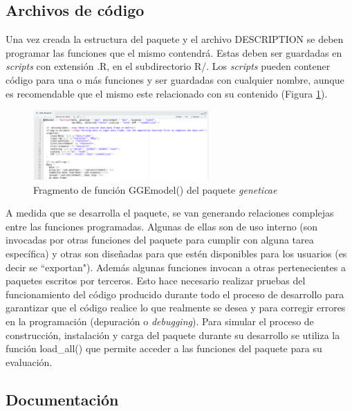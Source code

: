 \subsection{Archivos de código}

Una vez creada la estructura del paquete y el archivo DESCRIPTION se deben programar las funciones que el mismo contendrá. Estas deben ser guardadas en \emph{scripts} con extensión .R, en el subdirectorio R/. Los \emph{scripts} pueden contener código para una o más funciones y ser guardadas con cualquier nombre, aunque es recomendable que el mismo este relacionado con su contenido  (Figura \ref{fig:fig34}).

\begin{figure}[H]
	\begin{center}
		\includegraphics[width=0.60\textwidth]{./Graficos/GGEMODELFUNCTION.png}	
	\end{center}
	\caption{Fragmento de función \textcolor{fandango}{GGEmodel()} del paquete \emph{geneticae}}
	\label{fig:fig34}
\end{figure}


A medida que se desarrolla el paquete, se van generando relaciones complejas entre las funciones programadas. Algunas de ellas son de uso interno (son invocadas por otras funciones del paquete para cumplir con alguna tarea específica) y otras son diseñadas para que estén disponibles para los usuarios (es decir se ``exportan"). Además algunas funciones invocan a otras pertenecientes a paquetes escritos por terceros. Esto hace necesario realizar pruebas del funcionamiento del código  producido durante todo el proceso de desarrollo para garantizar que el código realice lo que realmente se desea y para corregir errores en la programación (depuración o \emph{debugging}). Para simular el proceso de construcción, instalación y carga del paquete durante su desarrollo se utiliza la función 
\textcolor{fandango}{load\_all()} que permite acceder a las funciones del paquete para su evaluación.


\subsection{Documentación}

